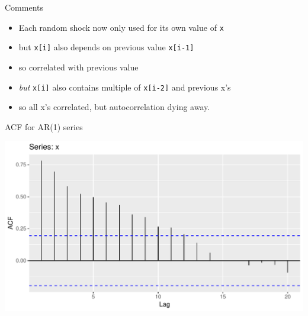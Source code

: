 \documentclass[ignorenonframetext,]{beamer}
\newenvironment{Shaded}{\begin{snugshade}}{\end{snugshade}}
\newcommand{\DataTypeTok}[1]{\textcolor[rgb]{0.13,0.29,0.53}{#1}}
\newcommand{\KeywordTok}[1]{\textcolor[rgb]{0.13,0.29,0.53}{\textbf{#1}}}
\newcommand{\NormalTok}[1]{#1}
\newcommand{\OperatorTok}[1]{\textcolor[rgb]{0.81,0.36,0.00}{\textbf{#1}}}
\newcommand{\StringTok}[1]{\textcolor[rgb]{0.31,0.60,0.02}{#1}}
\providecommand{\tightlist}{%
  \setlength{\itemsep}{0pt}\setlength{\parskip}{0pt}}
\begin{document}
\begin{frame}[fragile]{Comments}
\protect\hypertarget{comments-4}{}

\begin{itemize}
\tightlist
\item
  Each random shock now only used for its own value of \texttt{x}
\item
  but \texttt{x{[}i{]}} also depends on previous value
  \texttt{x{[}i-1{]}}
\item
  so correlated with previous value
\item
  \emph{but} \texttt{x{[}i{]}} also contains multiple of
  \texttt{x{[}i-2{]}} and previous x's
\item
  so all x's correlated, but autocorrelation dying away.
\end{itemize}

\end{frame}

\begin{frame}[fragile]{ACF for AR(1) series}
\protect\hypertarget{acf-for-ar1-series}{}

\begin{Shaded}
\end{Shaded}

\includegraphics{figure/unnamed-chunk-45-1.pdf}

\end{frame}
\end{document}
